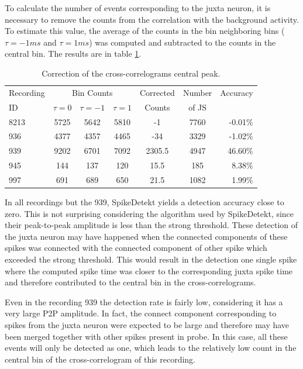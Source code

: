 \documentclass[10pt]{article}
\begin{document}
To calculate the number of events corresponding to the juxta neuron, it is necessary to remove the counts from the correlation with the background activity. To estimate this value, the average of the counts in the bin neighboring bins ($\tau = -1ms$ and $\tau = 1 ms$) was computed and subtracted to the counts in the central bin. The results are in table \ref{tab:CCcorrection}.

\begin{table}[!h]
\captionsetup{font=small}

\begin{center}
\begin{tabular}{p{1.5cm}cccccr} %

\multicolumn{ 1}{p{1.5cm}}{Recording } & \multicolumn{ 3}{c}{Bin Counts} &  \multicolumn{ 1}{p{1.3cm}}{Corrected} & \multicolumn{ 1}{c}{Number} & \multicolumn{ 1}{c}{Accuracy} \\ 
\multicolumn{ 1}{l}{ID} & $\tau=0$ & $\tau=-1$ & $\tau=1$ & \multicolumn{ 1}{c}{Counts} & \multicolumn{ 1}{p{1.3cm}}{of JS} & \multicolumn{ 1}{l}{} \\ \hline
8213 & 5725 & 5642 & 5810 & -1 & 7760 & -0.01\% \\
936 & 4377 & 4357 & 4465 & -34 & 3329 & -1.02\% \\
939 & 9202 & 6701 & 7092 & 2305.5 & 4947 & 46.60\% \\
945 & 144 & 137 & 120 & 15.5 & 185 & 8.38\% \\ 
997 & 691 & 689 & 650 & 21.5 & 1082 & 1.99\% \\ 
\end{tabular}
\end{center}
\caption{Correction of the cross-correlograms central peak.}
\label{tab:CCcorrection}
\end{table}


In all recordings but the 939, SpikeDetekt yields a detection accuracy close to zero. This is not surprising considering the algorithm used by SpikeDetekt, since their peak-to-peak amplitude is less than the strong threshold. These detection of the juxta neuron may have happened when the connected components of these spikes was connected with the connected component of other spike which exceeded the strong threshold. This would result in the detection one single spike where the computed spike time was closer to the corresponding juxta spike time and therefore contributed to the central bin in the cross-correlograms.

Even in the recording 939 the detection rate is fairly low, considering it has a very large P2P amplitude. In fact, the connect component corresponding to spikes from the juxta neuron were expected to be large and therefore may have been merged together with other spikes present in probe. In this case, all these events will only be detected as one, which leads to the relatively low count in the central bin of the cross-correlogram of this recording.
\end{document}
